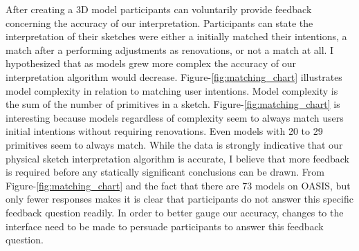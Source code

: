 After creating a 3D model participants can voluntarily provide feedback concerning the accuracy of our interpretation.
Participants can state the interpretation of their sketches were either a initially matched their intentions, a match after a performing adjustments as renovations, or not a match at all.
I hypothesized that as models grew more complex the accuracy of our interpretation algorithm would decrease.
Figure-\ref{fig:matching_chart} illustrates model complexity in relation to matching user intentions.
Model complexity is the sum of the number of primitives in a sketch.
Figure-\ref{fig:matching_chart} is interesting because models regardless of complexity seem to always match users initial intentions without requiring renovations.
Even models with 20 to 29 primitives seem to always match.
While the data is strongly indicative that our physical sketch interpretation algorithm is accurate, I believe that more feedback is required before any statically significant conclusions can be drawn.
From Figure-\ref{fig:matching_chart} and the fact that there are 73 models on OASIS, but only fewer responses makes it is clear that participants do not answer this specific feedback question readily.
In order to better gauge our accuracy, changes to the interface need to be made to persuade participants to answer this feedback question. \\

